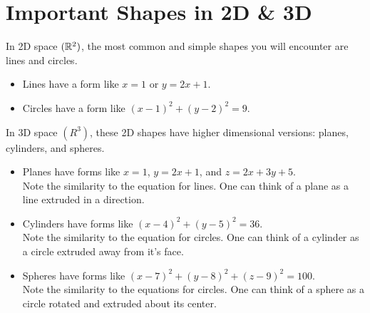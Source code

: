\section{Important Shapes in 2D \& 3D}
\noindent
In 2D space $(\mathbb{R}^2)$, the most common and simple shapes you will encounter are lines and circles.
\begin{itemize}
	\item Lines have a form like $x=1$ or $y=2x+1$.
	\item Circles have a form like $\left(x-1\right)^2 + \left(y-2\right)^2 = 9$.
\end{itemize}

\noindent
In 3D space $(R^3)$, these 2D shapes have higher dimensional versions: planes, cylinders, and spheres.
\begin{itemize}
	\item{Planes have forms like $x = 1$, $y = 2x+1$, and $z = 2x+3y+5$.\\
		\small{Note the similarity to the equation for lines. One can think of a plane as a line extruded in a direction.}}
	\item{Cylinders have forms like $\left(x-4\right)^2 + \left(y-5\right)^2 = 36$.\\
		\small{Note the similarity to the equation for circles. One can think of a cylinder as a circle extruded away from it's face.}}
	\item{Spheres have forms like $\left(x-7\right)^2 + \left(y-8\right)^2 + \left(z-9\right)^2 = 100$.\\
		\small{Note the similarity to the equations for circles. One can think of a sphere as a circle rotated and extruded about its center.}}
\end{itemize}